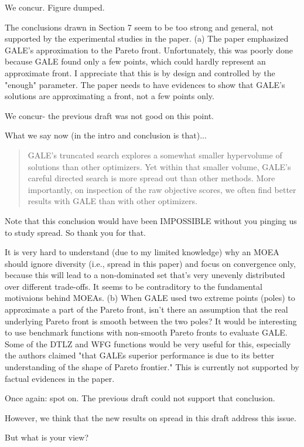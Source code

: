\documentclass[10pt,journal,compsoc]{IEEEtran}
\newenvironment{changed}{\par}{\par}
\begin{document}
\begin{changed}
We concur. Figure dumped.
\end{changed}

The conclusions drawn in Section 7 seem to be too strong and general, not
supported by the experimental studies in the paper. (a) The paper
emphasized GALE's approximation to the Pareto front. Unfortunately, this
was poorly done because GALE found only a few points, which could hardly
represent an approximate front. I appreciate that this is by design and
controlled by the "enough" parameter. The paper needs to have evidences to
show that GALE's solutions are approximating a front, not a few points
only. 


\begin{changed}
We concur- the previous draft was not good on this point.

What we say now (in the intro and conclusion is that)...
\begin{quote}
GALE’s truncated search explores a somewhat
smaller hypervolume of solutions than other optimizers.
Yet within that smaller volume, GALE’s careful directed
search is more spread out than other methods. More
importantly, on inspection of the raw objective scores,
we often find better results with GALE than with other
optimizers.
\end{quote}
Note that this conclusion would have been IMPOSSIBLE without you
pinging us to study spread. So thank you for that.
\end{changed}

It is very hard to understand (due to my limited knowledge) why an
MOEA should ignore diversity (i.e., spread in this paper) and focus on
convergence only, because this will lead to a non-dominated set that's
very unevenly distributed over different trade-offs. It seems to be
contraditory to the fundamental motivaions behind MOEAs. (b) When GALE
used two extreme points (poles) to approximate a part of the Pareto front,
isn't there an assumption that the real underlying Pareto front is smooth
between the two poles? It would be interesting to use benchmark functions
with non-smooth Pareto fronts to evaluate GALE. Some of the DTLZ and WFG
functions would be very useful for this, especially the authors claimed
"that GALEs superior performance is due to its better understanding of the
shape of Pareto frontier." This is currently not supported by factual
evidences in the paper.
\begin{changed}
Once again: spot on. The previous draft could not support that conclusion.

However,
we think that the new results on spread in this draft address this issue.

But what is your view?
\end{changed}
\end{document}
